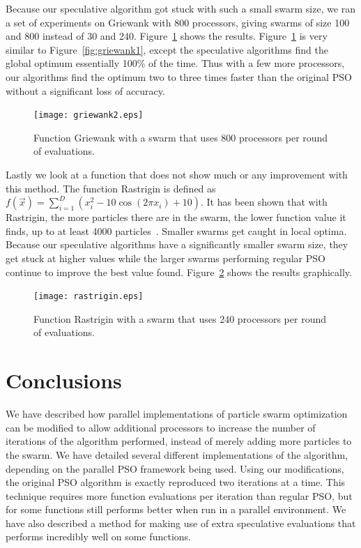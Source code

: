 \documentclass[oneside,honors]{honors}
\newcommand{\fig}[1]{Figure~\ref{fig:#1}}
\begin{document}
Because our speculative algorithm got stuck with such a small swarm size, we
ran a set of experiments on Griewank with 800 processors, giving swarms of size
100 and 800 instead of 30 and 240.  \fig{griewank2} shows the results.
\fig{griewank2} is very similar to \fig{griewank1}, except the speculative
algorithms find the global optimum essentially 100\% of the time.  Thus with a
few more processors, our algorithms find the optimum two to three times faster
than the original PSO without a significant loss of accuracy.

\begin{figure}
  \centering
  \texttt{[image: griewank2.eps]}
  \caption{Function Griewank with a swarm that uses 800 processors per round of
  evaluations.}
  \label{fig:griewank2}
\end{figure}

Lastly we look at a function that does not show much or any improvement with
this method.  The function Rastrigin is defined as $f(\Vec{x}) = \sum_{i=1}^D
\left(x_i^2 - 10\cos\left(2\pi x_i\right) + 10\right)$.  It has been shown that
with Rastrigin, the more particles there are in the swarm, the lower function
value it finds, up to at least 4000 particles~\cite{mcnabb-cec09}.  Smaller
swarms get caught in local optima.  Because our speculative algorithms have a
significantly smaller swarm size, they get stuck at higher values while the
larger swarms performing regular PSO continue to improve the best value found.
\fig{rastrigin} shows the results graphically.

\begin{figure}
  \centering
  \texttt{[image: rastrigin.eps]}
  \caption{Function Rastrigin with a swarm that uses 240 processors per round
  of evaluations.}
  \label{fig:rastrigin}
\end{figure}

\section{Conclusions}
\label{sec:conclusion}

We have described how parallel implementations of particle swarm optimization
can be modified to allow additional processors to increase the number of
iterations of the algorithm performed, instead of merely adding more particles
to the swarm.  We have detailed several different implementations of the
algorithm, depending on the parallel PSO framework being used.  Using our
modifications, the original PSO algorithm is exactly reproduced two iterations
at a time.  This technique requires more function evaluations per iteration
than regular PSO, but for some functions still performs better when run in a
parallel environment.  We have also described a method for making use of extra
speculative evaluations that performs incredibly well on some functions.
\end{document}

